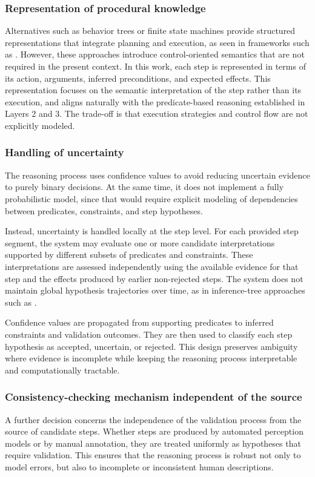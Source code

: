\subsubsection{Representation of procedural knowledge}
Alternatives such as behavior trees or finite state machines provide structured representations that integrate planning and execution, as seen in frameworks such as \citep{Zhao2025VideoToBT}. However, these approaches introduce control-oriented semantics that are not required in the present context. In this work, each step is represented in terms of its action, arguments, inferred preconditions, and expected effects. This representation focuses on the semantic interpretation of the step rather than its execution, and aligns naturally with the predicate-based reasoning established in Layers 2 and 3. The trade-off is that execution strategies and control flow are not explicitly modeled.

\subsubsection{Handling of uncertainty}

The reasoning process uses confidence values to avoid reducing uncertain evidence to purely binary decisions. At the same time, it does not implement a fully probabilistic model, since that would require explicit modeling of dependencies between predicates, constraints, and step hypotheses.

Instead, uncertainty is handled locally at the step level. For each provided step segment, the system may evaluate one or more candidate interpretations supported by different subsets of predicates and constraints. These interpretations are assessed independently using the available evidence for that step and the effects produced by earlier non-rejected steps. The system does not maintain global hypothesis trajectories over time, as in inference-tree approaches such as \citet{WangEtAl2018}.

Confidence values are propagated from supporting predicates to inferred constraints and validation outcomes. They are then used to classify each step hypothesis as accepted, uncertain, or rejected. This design preserves ambiguity where evidence is incomplete while keeping the reasoning process interpretable and computationally tractable.


\subsubsection{Consistency-checking mechanism independent of the source}
A further decision concerns the independence of the validation process from the source of candidate steps. Whether steps are produced by automated perception models or by manual annotation, they are treated uniformly as hypotheses that require validation. This ensures that the reasoning process is robust not only to model errors, but also to incomplete or inconsistent human descriptions.

